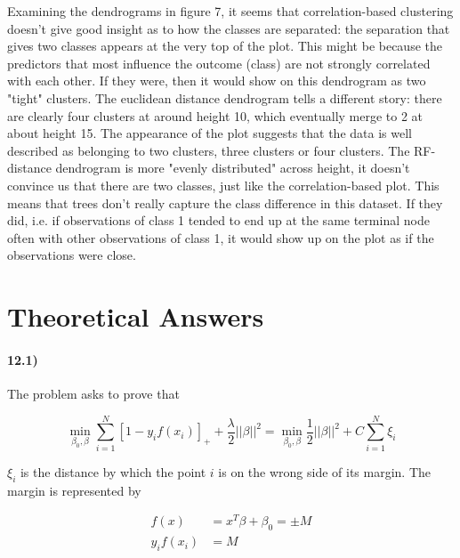 \documentclass{article}
\begin{document}
Examining the dendrograms in figure 7, it seems that correlation-based clustering doesn't give good insight as to how the classes are separated: the separation that gives two classes appears at the very top of the plot. This might be because the predictors that most influence the outcome (class) are not strongly correlated with each other. If they were, then it would show on this dendrogram as two "tight" clusters. The euclidean distance dendrogram tells a different story: there are clearly four clusters at around height 10, which eventually merge to 2 at about height 15. The appearance of the plot suggests that the data is well described as belonging to two clusters, three clusters or four clusters. The RF-distance dendrogram is more "evenly distributed" across height, it doesn't convince us that there are two classes, just like the correlation-based plot. This means that trees don't really capture the class difference in this dataset. If they did, i.e. if observations of class 1 tended to end up at the same terminal node often with other observations of class 1, it would show up on the plot as if the observations were close.

\vspace{\baselineskip}
\vspace{\baselineskip}
\vspace{\baselineskip}
\vspace{\baselineskip}

\section*{Theoretical Answers}
\paragraph{12.1)}

The problem asks to prove that

\begin{equation*}
\operatorname*{min}_{\beta_0,\beta}\sum_{i=1}^N[1-y_if(x_i)]_+ + \frac{\lambda}{2}||\beta||^2 = \operatorname*{min}_{\beta_0,\beta}\frac{1}{2}||\beta||^2 + C\sum_{i=1}^N \xi_i
\end{equation*}

$\xi_i$ is the distance by which the point $i$ is on the wrong side of its margin. The margin is represented by 

\begin{align*}
f(x) & = x^T\beta + \beta_0 = \pm M
\\
y_i f(x_i) & = M
\end{align*}
\end{document}
